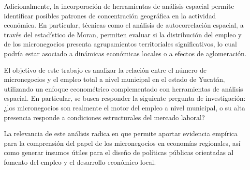 Adicionalmente, la incorporación de herramientas de análisis espacial permite identificar posibles patrones de concentración geográfica en la actividad económica. En particular, técnicas como el análisis de autocorrelación espacial, a través del estadístico de Moran, permiten evaluar si la distribución del empleo y de los micronegocios presenta agrupamientos territoriales significativos, lo cual podría estar asociado a dinámicas económicas locales o a efectos de aglomeración.

El objetivo de este trabajo es analizar la relación entre el número de micronegocios y el empleo total a nivel municipal en el estado de Yucatán, utilizando un enfoque econométrico complementado con herramientas de análisis espacial. En particular, se busca responder la siguiente pregunta de investigación: ¿los micronegocios son realmente el motor del empleo a nivel municipal, o su alta presencia responde a condiciones estructurales del mercado laboral?

La relevancia de este análisis radica en que permite aportar evidencia empírica para la comprensión del papel de los micronegocios en economías regionales, así como generar insumos útiles para el diseño de políticas públicas orientadas al fomento del empleo y el desarrollo económico local.